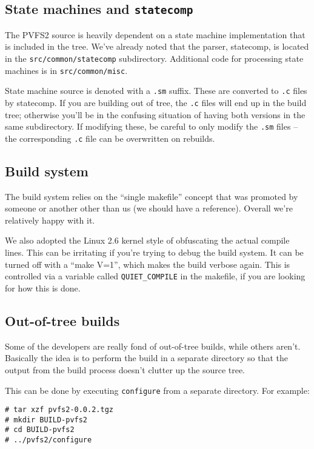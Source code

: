 \subsection{State machines and \texttt{statecomp}}

The PVFS2 source is heavily dependent on a state machine implementation that
is included in the tree.  We've already noted that the parser, statecomp, is
located in the \texttt{src/common/statecomp} subdirectory.  Additional code
for processing state machines is in \texttt{src/common/misc}.

State machine source is denoted with a \texttt{.sm} suffix.  These are
converted to \texttt{.c} files by statecomp.  If you are building out of tree,
the \texttt{.c} files will end up in the build tree; otherwise you'll be in
the confusing situation of having both versions in the same subdirectory.  If
modifying these, be careful to only modify the \texttt{.sm} files -- the
corresponding \texttt{.c} file can be overwritten on rebuilds.

\subsection{Build system}

The build system relies on the ``single makefile'' concept that was promoted
by someone or another other than us (we should have a reference).  Overall
we're relatively happy with it.

We also adopted the Linux 2.6 kernel style of obfuscating the actual compile
lines.  This can be irritating if you're trying to debug the build system.  It
can be turned off with a ``make V=1'', which makes the build verbose again.
This is controlled via a variable called \texttt{QUIET\_COMPILE} in the
makefile, if you are looking for how this is done.

\subsection{Out-of-tree builds}

Some of the developers are really fond of out-of-tree builds, while others
aren't.  Basically the idea is to perform the build in a separate directory so
that the output from the build process doesn't clutter up the source tree.

This can be done by executing \texttt{configure} from a separate directory.
For example:
\begin{verbatim}
# tar xzf pvfs2-0.0.2.tgz
# mkdir BUILD-pvfs2
# cd BUILD-pvfs2
# ../pvfs2/configure
\end{verbatim}



